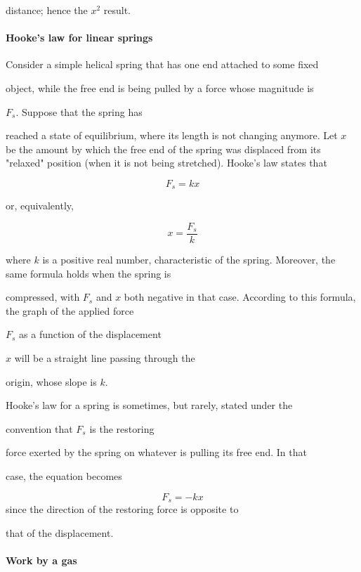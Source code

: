 distance; hence the $x^2$ result.



\paragraph{Hooke's law for linear springs}



Consider a simple helical spring that has one end attached to some fixed

object, while the free end is being pulled by a force whose magnitude is

$F _s$. Suppose that the spring has

reached a state of equilibrium, where its length is not changing anymore. Let $x$ be the amount by which the free end of the spring was displaced from its "relaxed" position (when it is not being stretched). Hooke's law states that



$$F _s = kx$$



or, equivalently,



$$x = \frac{F _s}{k}$$



where $k$ is a positive real number, characteristic of the spring. Moreover, the same formula holds when the spring is

compressed, with $F _s$ and $x$ both negative in that case. According to this formula, the graph of the applied force

$F _s$ as a function of the displacement

$x$ will be a straight line passing through the

origin, whose slope is $k$.



Hooke's law for a spring is sometimes, but rarely, stated under the

convention that $F _s$ is the restoring

force exerted by the spring on whatever is pulling its free end. In that

case, the equation becomes



$$F _s = -kx$$ since the direction of the restoring force is opposite to

that of the displacement.



\paragraph{Work by a gas}



